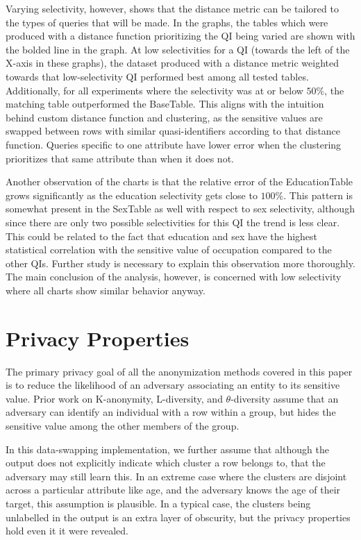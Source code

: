 Varying selectivity, however, shows that the distance metric can be tailored to the types of queries that will be made. In the graphs, the tables which were produced with a distance function prioritizing the QI being varied are shown with the bolded line in the graph. At low selectivities for a QI (towards the left of the X-axis in these graphs), the dataset produced with a distance metric weighted towards that low-selectivity QI performed best among all tested tables. Additionally, for all experiments where the selectivity was at or below $50\%$, the matching table outperformed the BaseTable. This aligns with the intuition behind custom distance function and clustering, as the sensitive values are swapped between rows with similar quasi-identifiers according to that distance function. Queries specific to one attribute have lower error when the clustering prioritizes that same attribute than when it does not.

Another observation of the charts is that the relative error of the EducationTable grows significantly as the education selectivity gets close to $100\%$. This pattern is somewhat present in the SexTable as well with respect to sex selectivity, although since there are only two possible selectivities for this QI the trend is less clear. This could be related to the fact that education and sex have the highest statistical correlation with the sensitive value of occupation compared to the other QIs. Further study is necessary to explain this observation more thoroughly. The main conclusion of the analysis, however, is concerned with low selectivity where all charts show similar behavior anyway.

\section{Privacy Properties}
The primary privacy goal of all the anonymization methods covered in this paper is to reduce the likelihood of an adversary associating an entity to its sensitive value. Prior work on K-anonymity, L-diversity, and $\theta$-diversity assume that an adversary can identify an individual with a row within a group, but hides the sensitive value among the other members of the group.

In this data-swapping implementation, we further assume that although the output does not explicitly indicate which cluster a row belongs to, that the adversary may still learn this. In an extreme case where the clusters are disjoint across a particular attribute like age, and the adversary knows the age of their target, this assumption is plausible. In a typical case, the clusters being unlabelled in the output is an extra layer of obscurity, but the privacy properties hold even it it were revealed.

